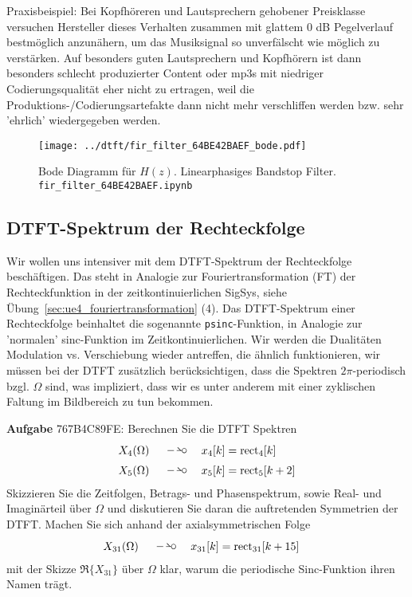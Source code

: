 Praxisbeispiel:
Bei Kopfhöreren und Lautsprechern gehobener Preisklasse versuchen Hersteller
dieses Verhalten zusammen mit glattem 0 dB Pegelverlauf bestmöglich anzunähern,
um das Musiksignal so unverfälscht wie möglich zu verstärken.
%
Auf besonders guten Lautsprechern und Kopfhörern ist dann besonders schlecht
produzierter Content oder mp3s mit niedriger Codierungsqualität eher nicht zu ertragen, weil
die Produktions-/Codierungsartefakte dann nicht mehr verschliffen werden bzw.
sehr 'ehrlich' wiedergegeben werden.
%


\begin{figure}
\centering
\texttt{[image: ../dtft/fir\_filter\_64BE42BAEF\_bode.pdf]}
\caption{Bode Diagramm für $H(z)$. Linearphasiges Bandstop Filter.
\texttt{fir\_filter\_64BE42BAEF.ipynb}}
\label{fig:fir_filter_64BE42BAEF_bode}
\end{figure}










\clearpage
\subsection{DTFT-Spektrum der Rechteckfolge}
\label{sec:767B4C89FE}
\begin{Ziel}
Wir wollen uns intensiver mit dem DTFT-Spektrum der Rechteckfolge beschäftigen.
Das steht in Analogie zur Fouriertransformation (FT) der Rechteckfunktion in
der zeitkontinuierlichen SigSys, siehe Übung~\ref{sec:ue4_fouriertransformation} (4).
Das DTFT-Spektrum einer Rechteckfolge beinhaltet die sogenannte \texttt{psinc}-Funktion,
in Analogie zur 'normalen' sinc-Funktion im Zeitkontinuierlichen.
%
Wir werden die Dualitäten Modulation vs. Verschiebung wieder antreffen, die ähnlich
funktionieren, wir müssen bei der DTFT zusätzlich berücksichtigen, dass
die Spektren $2\pi$-periodisch bzgl. $\Omega$ sind, was impliziert, dass
wir es unter anderem mit einer zyklischen Faltung im Bildbereich zu tun bekommen.
%
\end{Ziel}
\textbf{Aufgabe} {\tiny 767B4C89FE}: Berechnen Sie die DTFT Spektren
\begin{align}
X_4(\Omega) \quad\DTFT\quad & x_4[k] = \mathrm{rect}_4[k]\\
X_5(\Omega) \quad\DTFT\quad & x_5[k] = \mathrm{rect}_5[k+2]
\end{align}
Skizzieren Sie die Zeitfolgen, Betrags- und Phasenspektrum, sowie
Real- und Imaginärteil über $\Omega$ und diskutieren Sie daran die auftretenden
Symmetrien der DTFT.
%
Machen Sie sich anhand der axialsymmetrischen Folge
\begin{align}
X_{31}(\Omega) \quad\DTFT\quad & x_{31}[k] = \mathrm{rect}_{31}[k+15]
\end{align}
mit der Skizze $\Re\{X_{31}\}$ über $\Omega$ klar, warum die periodische
Sinc-Funktion ihren Namen trägt.


